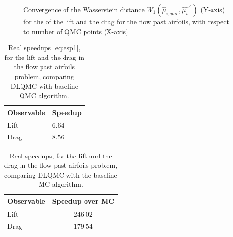 \documentclass[a4paper]{article}
\numberwithin{equation}{section}
\numberwithin{equation}{section}
\theoremstyle{definition}
\theoremstyle{myremarkstyle}
\begin{document}
\begin{figure}[htbp]
\caption{Convergence of the Wasserstein distance $W_1\left(\hat{\mu}_{i,qmc},\hat{\mu_i}^{\Delta} \right)$ (Y-axis) for the of the lift and the drag for the flow past airfoils, with respect to number of QMC points (X-axis)}
\label{fig:afoilQMCcomp}
\end{figure}
\begin{table}[htbp]
\centering
\begin{tabular}{|l|l|}
\hline
Observable & Speedup \\
\hline
Lift & $6.64$ \\
\hline
Drag & $8.56$ \\
\hline

\end{tabular}
\caption{Real speedups \eqref{eq:esp1}, for the lift and the drag in the flow past airfoils problem, comparing DLQMC with baseline QMC algorithm.}
\label{tab:afoilrsp}
\end{table}
\begin{table}[htbp]
\centering
\begin{tabular}{|l|c|}
\hline
Observable & Speedup over MC \\
\hline
Lift & $246.02$ \\
\hline
Drag & $179.54$ \\
\hline
\end{tabular}
\caption{Real speedups, for the lift and the drag in the flow past airfoils problem, comparing DLQMC with the baseline MC algorithm.}
\label{tab:afoilmcsp}
\end{table}
 
\end{document}
